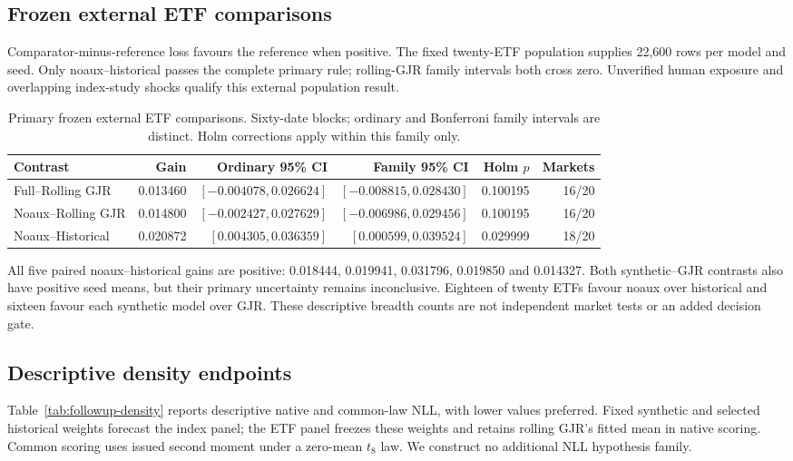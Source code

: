 \FloatBarrier

\subsection{Frozen external ETF comparisons}

Comparator-minus-reference loss favours the reference when positive. The fixed twenty-ETF population supplies 22,600 rows per model and seed. Only noaux--historical passes the complete primary rule; rolling-GJR family intervals both cross zero. Unverified human exposure and overlapping index-study shocks qualify this external population result.

\begin{table}[!htbp]\centering\footnotesize
\setlength{\tabcolsep}{3pt}
\caption[Frozen external ETF comparisons intervals]{Primary frozen external ETF comparisons. Sixty-date blocks; ordinary and Bonferroni family intervals are distinct. Holm corrections apply within this family only.}
\label{tab:followup-inference-2}
\begin{tabular}{lrrrrr}
\toprule Contrast & Gain & Ordinary 95\% CI & Family 95\% CI & Holm $p$ & Markets \\
\midrule
Full--Rolling GJR & 0.013460 & $[-0.004078,0.026624]$ & $[-0.008815,0.028430]$ & 0.100195 & 16/20 \\
Noaux--Rolling GJR & 0.014800 & $[-0.002427,0.027629]$ & $[-0.006986,0.029456]$ & 0.100195 & 16/20 \\
Noaux--Historical & 0.020872 & $[0.004305,0.036359]$ & $[0.000599,0.039524]$ & 0.029999 & 18/20 \\
\bottomrule\end{tabular}\end{table}

All five paired noaux--historical gains are positive: 0.018444, 0.019941, 0.031796, 0.019850 and 0.014327. Both synthetic--GJR contrasts also have positive seed means, but their primary uncertainty remains inconclusive. Eighteen of twenty ETFs favour noaux over historical and sixteen favour each synthetic model over GJR. These descriptive breadth counts are not independent market tests or an added decision gate.

\FloatBarrier

\subsection{Descriptive density endpoints}

Table~\ref{tab:followup-density} reports descriptive native and common-law NLL, with lower values preferred. Fixed synthetic and selected historical weights forecast the index panel; the ETF panel freezes these weights and retains rolling GJR's fitted mean in native scoring. Common scoring uses issued second moment under a zero-mean $t_8$ law. We construct no additional NLL hypothesis family.

